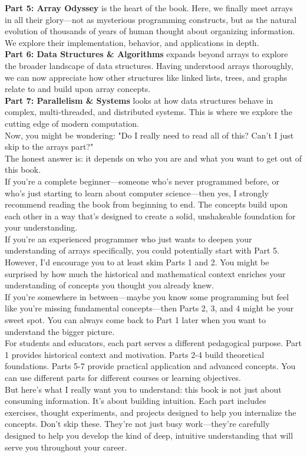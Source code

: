 \documentclass[12pt, oneside, openany]{book}
\begin{document}
\textbf{Part 5: Array Odyssey} is the heart of the book. Here, we finally meet arrays in all their glory—not as mysterious programming constructs, but as the natural evolution of thousands of years of human thought about organizing information. We explore their implementation, behavior, and applications in depth.\\
\textbf{Part 6: Data Structures \& Algorithms} expands beyond arrays to explore the broader landscape of data structures. Having understood arrays thoroughly, we can now appreciate how other structures like linked lists, trees, and graphs relate to and build upon array concepts.\\
\textbf{Part 7: Parallelism \& Systems} looks at how data structures behave in complex, multi-threaded, and distributed systems. This is where we explore the cutting edge of modern computation.\\
Now, you might be wondering: "Do I really need to read all of this? Can't I just skip to the arrays part?" \\
The honest answer is: it depends on who you are and what you want to get out of this book.\\
If you're a complete beginner—someone who's never programmed before, or who's just starting to learn about computer science—then yes, I strongly recommend reading the book from beginning to end. The concepts build upon each other in a way that's designed to create a solid, unshakeable foundation for your understanding.\\
If you're an experienced programmer who just wants to deepen your understanding of arrays specifically, you could potentially start with Part 5. However, I'd encourage you to at least skim Parts 1 and 2. You might be surprised by how much the historical and mathematical context enriches your understanding of concepts you thought you already knew.\\
If you're somewhere in between—maybe you know some programming but feel like you're missing fundamental concepts—then Parts 2, 3, and 4 might be your sweet spot. You can always come back to Part 1 later when you want to understand the bigger picture.\\
For students and educators, each part serves a different pedagogical purpose. Part 1 provides historical context and motivation. Parts 2-4 build theoretical foundations. Parts 5-7 provide practical application and advanced concepts. You can use different parts for different courses or learning objectives.\\
But here's what I really want you to understand: this book is not just about consuming information. It's about building intuition. Each part includes exercises, thought experiments, and projects designed to help you internalize the concepts. Don't skip these. They're not just busy work—they're carefully designed to help you develop the kind of deep, intuitive understanding that will serve you throughout your career.\\
\end{document}
